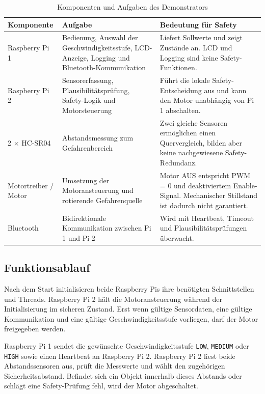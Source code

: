 \begin{table}[H]
    \centering
    \small
    \begin{tabularx}{\textwidth}{@{}p{3.7cm}YY@{}}
        \toprule
        \textbf{Komponente} & \textbf{Aufgabe} & \textbf{Bedeutung für Safety} \\
        \midrule
        Raspberry Pi 1 & Bedienung, Auswahl der Geschwindigkeitsstufe, LCD-Anzeige, Logging und Bluetooth-Kommunikation & Liefert Sollwerte und zeigt Zustände an. LCD und Logging sind keine Safety-Funktionen. \\
        Raspberry Pi 2 & Sensorerfassung, Plausibilitätsprüfung, Safety-Logik und Motorsteuerung & Führt die lokale Safety-Entscheidung aus und kann den Motor unabhängig von Pi 1 abschalten. \\
        2 $\times$ HC-SR04 & Abstandsmessung zum Gefahrenbereich & Zwei gleiche Sensoren ermöglichen einen Quervergleich, bilden aber keine nachgewiesene Safety-Redundanz. \\
        Motortreiber / Motor & Umsetzung der Motoransteuerung und rotierende Gefahrenquelle & Motor AUS entspricht PWM = 0 und deaktiviertem Enable-Signal. Mechanischer Stillstand ist dadurch nicht garantiert. \\
        Bluetooth & Bidirektionale Kommunikation zwischen Pi 1 und Pi 2 & Wird mit Heartbeat, Timeout und Plausibilitätsprüfungen überwacht. \\
        \bottomrule
    \end{tabularx}
    \caption{Komponenten und Aufgaben des Demonstrators}
\end{table}

\subsection{Funktionsablauf}

Nach dem Start initialisieren beide Raspberry Pis ihre benötigten Schnittstellen
und Threads. Raspberry Pi 2 hält die Motoransteuerung während der
Initialisierung im sicheren Zustand. Erst wenn gültige Sensordaten, eine gültige
Kommunikation und eine gültige Geschwindigkeitsstufe vorliegen, darf der Motor
freigegeben werden.

Raspberry Pi 1 sendet die gewünschte Geschwindigkeitsstufe
\texttt{LOW}, \texttt{MEDIUM} oder \texttt{HIGH} sowie einen Heartbeat an
Raspberry Pi 2. Raspberry Pi 2 liest beide Abstandssensoren aus, prüft die
Messwerte und wählt den zugehörigen Sicherheitsabstand. Befindet sich ein Objekt
innerhalb dieses Abstands oder schlägt eine Safety-Prüfung fehl, wird der Motor
abgeschaltet.

